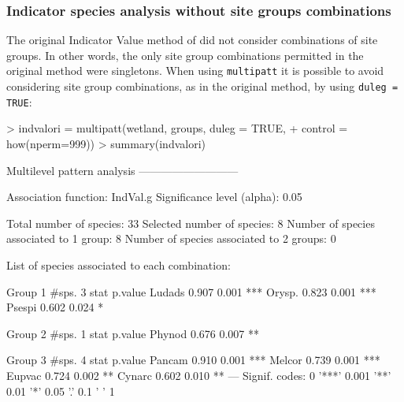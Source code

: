\documentclass[11pt,a4paper]{article}
\begin{document}
\subsubsection{Indicator species analysis without site groups combinations}
The original Indicator Value method of \citet{Dufrene1997} did not consider combinations of site groups. In other words, the only site group combinations permitted in the original method were singletons. When using \texttt{multipatt} it is possible to avoid considering site group combinations, as in the original method, by using \texttt{duleg = TRUE}:
\begin{Schunk}
\begin{Sinput}
> indvalori = multipatt(wetland, groups, duleg = TRUE, 
+                       control = how(nperm=999)) 
> summary(indvalori)
\end{Sinput}
\begin{Soutput}
 Multilevel pattern analysis
 ---------------------------

 Association function: IndVal.g
 Significance level (alpha): 0.05

 Total number of species: 33
 Selected number of species: 8 
 Number of species associated to 1 group: 8 
 Number of species associated to 2 groups: 0 

 List of species associated to each combination: 

 Group 1  #sps.  3 
        stat p.value    
Ludads 0.907   0.001 ***
Orysp. 0.823   0.001 ***
Psespi 0.602   0.024 *  

 Group 2  #sps.  1 
        stat p.value   
Phynod 0.676   0.007 **

 Group 3  #sps.  4 
        stat p.value    
Pancam 0.910   0.001 ***
Melcor 0.739   0.001 ***
Eupvac 0.724   0.002 ** 
Cynarc 0.602   0.010 ** 
---
Signif. codes:  0 '***' 0.001 '**' 0.01 '*' 0.05 '.' 0.1 ' ' 1 
\end{Soutput}
\end{Schunk}
\end{document}
